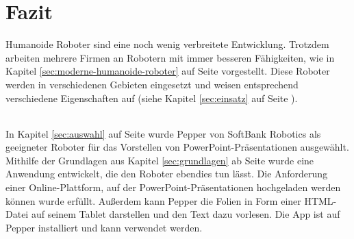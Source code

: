 \chapter{Fazit}\label{sec:fazit}
Humanoide Roboter sind eine noch wenig verbreitete Entwicklung. Trotzdem
arbeiten mehrere Firmen an Robotern mit immer besseren Fähigkeiten, wie in
Kapitel \ref{sec:moderne-humanoide-roboter} auf Seite
\pageref{sec:moderne-humanoide-roboter} vorgestellt. Diese Roboter werden in
verschiedenen Gebieten eingesetzt und weisen entsprechend verschiedene
Eigenschaften auf (siehe Kapitel \ref{sec:einsatz} auf Seite
\pageref{sec:einsatz}).

\subparagraph{}
In Kapitel \ref{sec:auswahl} auf Seite \pageref{sec:auswahl} wurde Pepper von
SoftBank Robotics als geeigneter Roboter für das Vorstellen von
PowerPoint-Präsentationen ausgewählt. Mithilfe der Grundlagen aus Kapitel
\ref{sec:grundlagen} ab Seite \pageref{sec:grundlagen} wurde eine Anwendung
entwickelt, die den Roboter ebendies tun lässt. Die Anforderung einer
Online-Plattform, auf der PowerPoint-Präsentationen hochgeladen werden können
wurde erfüllt. Außerdem kann Pepper die Folien in Form einer HTML-Datei auf
seinem Tablet darstellen und den Text dazu vorlesen. Die App ist auf Pepper
installiert und kann verwendet werden.
